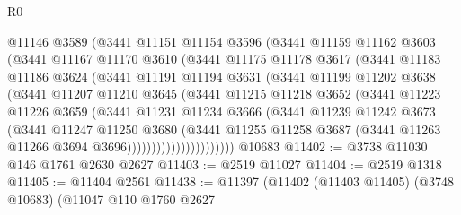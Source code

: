 \begin{lexlean}{R0}
\begin{coremodule}
                  @11146
                  @3589
                  (@3441
                    @11151
                    @11154
                    @3596
                    (@3441
                      @11159
                      @11162
                      @3603
                      (@3441
                        @11167
                        @11170
                        @3610
                        (@3441
                          @11175
                          @11178
                          @3617
                          (@3441
                            @11183
                            @11186
                            @3624
                            (@3441
                              @11191
                              @11194
                              @3631
                              (@3441
                                @11199
                                @11202
                                @3638
                                (@3441
                                  @11207
                                  @11210
                                  @3645
                                  (@3441
                                    @11215
                                    @11218
                                    @3652
                                    (@3441
                                      @11223
                                      @11226
                                      @3659
                                      (@3441
                                        @11231
                                        @11234
                                        @3666
                                        (@3441
                                          @11239
                                          @11242
                                          @3673
                                          (@3441
                                            @11247
                                            @11250
                                            @3680
                                            (@3441
                                              @11255
                                              @11258
                                              @3687
                                              (@3441 @11263 @11266 @3694 @3696))))))))))))))))))))))
    @10683
@11402 := @3738 @11030 @146 @1761 @2630 @2627
@11403 := @2519 @11027
@11404 := @2519 @1318
@11405 := @11404 @2561
@11438 := @11397
    (@11402
      (@11403 @11405)
      (@3748 @10683)
      (@11047
        @110
        @1760
        @2627

\end{coremodule}
\end{lexlean}
